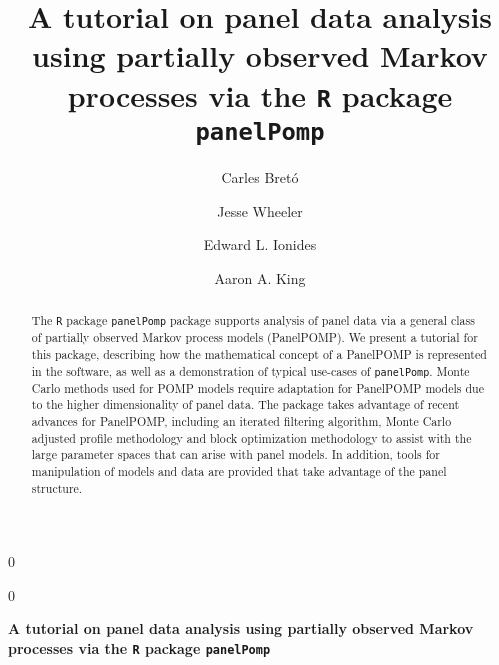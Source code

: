 \documentclass[12pt]{article}\usepackage[]{graphicx}\usepackage[table]{xcolor}
\newcommand{\blind}{0}
\newcommand\R{\texttt{R}\xspace}
\newcommand\panelPomp{\texttt{panelPomp}\xspace}
\begin{document}
%

\def\spacingset#1{\renewcommand{\baselinestretch}%
{#1}\small\normalsize} \spacingset{1}




\blind
{
  \title{\bf A tutorial on panel data analysis using partially observed Markov processes via the \R package \panelPomp}

  \author[1]{Carles Bret\'o}
  \author[2]{Jesse Wheeler}
  \author[2]{Edward L. Ionides}
  \author[2]{Aaron A. King}


  \maketitle
} \fi

\blind
{
  \bigskip
  \bigskip
  \bigskip
  \begin{center}
    {\Large\bf A tutorial on panel data analysis using partially observed Markov processes via the \R package \panelPomp}
\end{center}
  \medskip
} \fi

\bigskip
\begin{abstract}
\noindent The \R package \panelPomp package supports analysis of panel data via a general class of partially observed Markov process models (PanelPOMP).
We present a tutorial for this package, describing how the mathematical concept of a PanelPOMP is represented in the software, as well as a demonstration of typical use-cases of \panelPomp.
Monte Carlo methods used for POMP models require adaptation for PanelPOMP models due to the higher dimensionality of panel data.
The package takes advantage of recent advances for PanelPOMP, including an iterated filtering algorithm, Monte Carlo adjusted profile methodology and block optimization methodology to assist with the large parameter spaces that can arise with panel models.
In addition, tools for manipulation of models and data are provided that take advantage of the panel structure.
\end{abstract}
\end{document}
